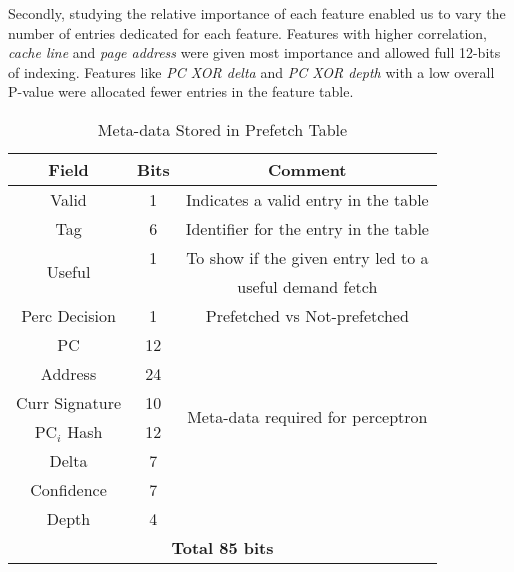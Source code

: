 Secondly, studying the relative importance of each feature enabled us to vary
the number of entries dedicated for each feature. Features with higher
correlation, \textit{cache line} and \textit{page address} were given most
importance and allowed full 12-bits of indexing. Features like \textit{PC XOR
delta} and \textit{PC XOR depth} with a low overall P-value were allocated
fewer entries in the feature table.


\begin{table}[ht]
    \centering
    \begin{tabular}{|c|c|c|}
    \hline
        \textbf{Field} &
        \textbf{Bits} &
        \textbf{Comment} \\
    \hline
         Valid 		& 1  & Indicates a valid entry in the table\\
         Tag 		& 6  & Identifier for the entry in the table\\
         \multirow{2}{1cm}{Useful} 	& 1  & To show if the given entry led to a\\
                    	&    & useful demand fetch\\
         Perc Decision 	& 1  & Prefetched vs Not-prefetched \\
    \hline
        PC 		& 12 & \\
        Address 	& 24 & \\
        Curr Signature 	& 10 & \multirow{2}{4.8cm}{Meta-data required for perceptron}\\
	PC$_i$ Hash	& 12 & \multirow{2}{1.1cm}{training}\\
        Delta 		& 7  & \\
        Confidence 	& 7  & \\
	Depth		& 4  & \\
    \hline
        \multicolumn{3}{|c|}{\textbf{Total 85 bits}}\\
    \hline
    \end{tabular}
    \caption{Meta-data Stored in Prefetch Table}
    \label{tab:PTable_metadata}
\end{table}


